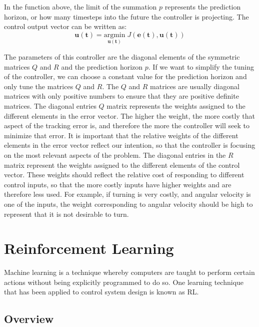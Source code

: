 \documentclass[conference]{IEEEtran}
\begin{document}
In the function above, the limit of the summation $p$ represents the prediction horizon, or how many timesteps into the future the controller is projecting. The control output vector can be written as: $$\mathbf{u(t)} = \underset{\mathbf{u(t)}}{\mathrm{argmin}} \; J(\mathbf{e(t)}, \mathbf{u(t)})$$

The parameters of this controller are the diagonal elements of the symmetric matrices $Q$ and $R$ and the prediction horizon $p$. If we want to simplify the tuning of the controller, we can choose a constant value for the prediction horizon and only tune the matrices $Q$ and $R$. The $Q$ and $R$ matrices are usually diagonal matrices with only positive numbers to ensure that they are positive definite matrices. The diagonal entries $Q$ matrix represents the weights assigned to the different elements in the error vector. The higher the weight, the more costly that aspect of the tracking error is, and therefore the more the controller will seek to minimize that error. It is important that the relative weights of the different elements in the error vector reflect our intention, so that the controller is focusing on the most relevant aspects of the problem. The diagonal entries in the $R$ matrix represent the weights assigned to the different elements of the control vector. These weights should reflect the relative cost of responding to different control inputs, so that the more costly inputs have higher weights and are therefore less used. For example, if turning is very costly, and angular velocity is one of the inputs, the weight corresponding to angular velocity should be high to represent that it is not desirable to turn.

\section{Reinforcement Learning} \label{RLFA}

Machine learning is a technique whereby computers are taught to perform certain actions without being explicitly programmed to do so. One learning technique that has been applied to control system design is known as RL. 

\subsection{Overview}
\end{document}
